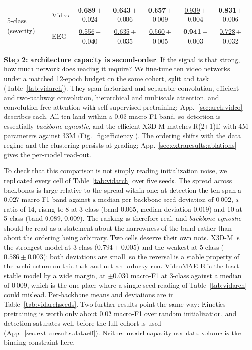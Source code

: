 \begin{table}[t]
{\begin{tabular}{@{}l l c c c c c@{}}
\midrule
\multirow{2}{*}{5-class (severity)}  & Video & \textbf{0.689}\,{\scriptsize$\pm$0.024} & \textbf{0.643}\,{\scriptsize$\pm$0.006} & \textbf{0.657}\,{\scriptsize$\pm$0.009} & \underline{0.939}\,{\scriptsize$\pm$0.004} & \textbf{0.831}\,{\scriptsize$\pm$0.006} \\
                                     & EEG   & \underline{0.556}\,{\scriptsize$\pm$0.040} & \underline{0.635}\,{\scriptsize$\pm$0.035} & \underline{0.560}\,{\scriptsize$\pm$0.005} & \textbf{0.941}\,{\scriptsize$\pm$0.003} & \underline{0.728}\,{\scriptsize$\pm$0.032} \\
\bottomrule
\end{tabular}}
\end{table}

\noindent\textbf{Step 2: architecture capacity is second-order.}
If the signal is that strong, how much network does reading it require? We fine-tune ten video networks under a matched 12-epoch budget on the same cohort, split and task (Table~\ref{tab:vidarch}). They span factorized and separable convolution, efficient and two-pathway convolution, hierarchical and multiscale attention, and convolution-free attention with self-supervised pretraining; App.~\ref{sec:arch:video} describes each. All ten land within a 0.03 macro-F1 band, so detection is
essentially \emph{backbone-agnostic}, and the efficient X3D-M matches R(2+1)D with 4M
parameters against 33M (Fig.~\ref{fig:efficiency}). The ordering shifts with the data
regime and the clustering persists at grading;
App.~\ref{sec:extraresults:ablations} gives the per-model read-out.

To check that this comparison is not simply reading initialization noise, we replicated
every cell of Table~\ref{tab:vidarch} over five seeds. The spread across backbones is
large relative to the spread within one: at detection the ten span a 0.027 macro-F1 band
against a median per-backbone seed deviation of 0.002, a ratio of 14, rising to 8 at
3-class (band 0.065, median deviation 0.009) and 10 at 5-class (band 0.089, 0.009). The
ranking is therefore real, and \emph{backbone-agnostic} should be read as a statement
about the narrowness of the band rather than about the ordering being arbitrary. Two
cells deserve their own note. X3D-M is the strongest model at 3-class
($0.794\pm0.005$) and the weakest at 5-class ($0.586\pm0.003$); both deviations are
small, so the reversal is a stable property of the architecture on this task and not an
unlucky run. VideoMAE-B is the least stable model by a wide margin, at
$\pm0.030$ macro-F1 at 3-class against a median of 0.009, which is the one place where
a single-seed reading of Table~\ref{tab:vidarch} could mislead. Per-backbone means and
deviations are in Table~\ref{tab:vidarchseeds}. Two further
results point the same way: Kinetics pretraining is worth only about 0.02 macro-F1
over random initialization, and detection saturates well before the full cohort is
used (App.~\ref{sec:extraresults:dataeff}). Neither model capacity nor data volume is
the binding constraint here.

